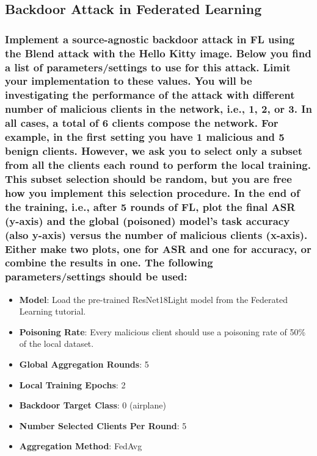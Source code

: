 \documentclass{article}
\begin{document}


\subsection{Backdoor Attack in Federated Learning}
\subsubsection{Implement a source-agnostic backdoor attack in FL using the
Blend attack with the Hello Kitty image. Below you find a list of parameters/settings to use for this attack. Limit your implementation to these values.
You will be investigating the performance of the attack with different number of
malicious clients in the network, i.e., 1, 2, or 3. In all cases, a total of 6 clients
compose the network. For example, in the first setting you have 1 malicious
and 5 benign clients. However, we ask you to select only a subset from all the
clients each round to perform the local training. This subset selection should be
random, but you are free how you implement this selection procedure. In the
end of the training, i.e., after 5 rounds of FL, plot the final ASR (y-axis) and
the global (poisoned) model’s task accuracy (also y-axis) versus the number of
malicious clients (x-axis). Either make two plots, one for ASR and one for accuracy, or combine the results in one. The following parameters/settings should
be used:}
\begin{itemize}
    \item \textbf{Model}: Load the pre-trained ResNet18Light model from the Federated
    Learning tutorial.
    \item \textbf{Poisoning Rate}: Every malicious client should use a poisoning rate of
    50\% of the local dataset.
    \item \textbf{Global Aggregation Rounds}: 5
    \item \textbf{Local Training Epochs}: 2
    \item \textbf{Backdoor Target Class}: 0 (airplane)
    \item \textbf{Number Selected Clients Per Round}: 5
    \item \textbf{Aggregation Method}: FedAvg
\end{itemize}
\end{document}
